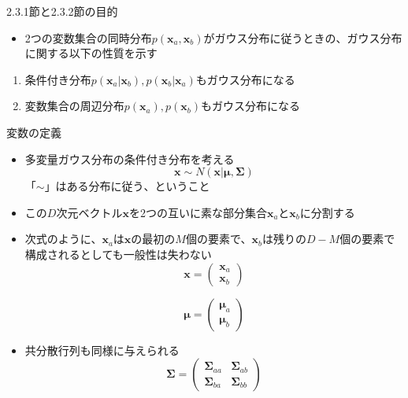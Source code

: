 \begin{frame}{2.3.1節と2.3.2節の目的}
 \begin{itemize}
  \item 2つの変数集合の同時分布$p(\bm{x}_a,\bm{x}_b)$がガウス分布に従うときの、ガウス分布に関する以下の性質を示す
 \end{itemize}
 \begin{enumerate}
  \item 条件付き分布$p(\bm{x}_a|\bm{x}_b),p(\bm{x}_b|\bm{x}_a)$もガウス分布になる
  \item 変数集合の周辺分布$p(\bm{x}_a),p(\bm{x}_b)$もガウス分布になる
 \end{enumerate}
\end{frame}

\begin{frame}{変数の定義}
 \begin{itemize}
  \item 多変量ガウス分布の条件付き分布を考える
        \begin{equation}
         \bm{x}\sim N(\bm{x}|\bm{\mu}, \bm{\Sigma})
        \end{equation}
        「$\sim$」はある分布に従う、ということ
  \item この$D$次元ベクトル$\bm{x}$を2つの互いに素な部分集合$\bm{x}_a$と$\bm{x}_b$に分割する
  \item 次式のように、$\bm{x}_a$は$\bm{x}$の最初の$M$個の要素で、$\bm{x}_b$は残りの$D-M$個の要素で構成されるとしても一般性は失わない
        \begin{equation}
         \bm{x} =
          \begin{pmatrix}
           \bm{x}_a \\
           \bm{x}_b
          \end{pmatrix}
        \end{equation}

        \begin{equation}
         \bm{\mu} =
          \begin{pmatrix}
           \bm{\mu}_a \\
           \bm{\mu}_b
          \end{pmatrix}
        \end{equation}
  \item 共分散行列も同様に与えられる
        \begin{equation}
         \bm{\Sigma} =
          \begin{pmatrix}
           \bm{\Sigma}_{aa} & \bm{\Sigma}_{ab} \\
           \bm{\Sigma}_{ba} & \bm{\Sigma}_{bb}
          \end{pmatrix}
        \end{equation}
 \end{itemize}
\end{frame}

